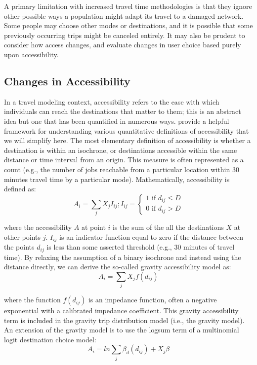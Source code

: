 A primary limitation with increased travel time methodologies is that they
ignore other possible ways a population might adapt its travel to a
damaged
network. Some people may choose other modes or destinations, and it is
possible
that some previously occurring trips might be canceled entirely. It may also be
prudent to consider how access changes, and evaluate changes in user choice
based purely upon accessibility.

\subsection{Changes in Accessibility}
\label{sec:cacc}
In a travel modeling context, {accessibility} refers to the ease
with which
individuals can reach the destinations that matter to them; this is an
abstract
idea but one that has been quantified in numerous ways. \citet{dong2006}
provide a
helpful framework for understanding various quantitative definitions of
accessibility that we will simplify here. The most elementary definition of
accessibility is whether a destination is within an isochrone, or
destinations accessible within the same distance or time interval from an origin.
This measure is often represented as a count (e.g., the number
of jobs
reachable from a particular location within 30 minutes travel time by a
particular mode). Mathematically, accessibility is defined as:
\begin{equation}
A_i = \sum_{j} X_j I_{ij}; I_{ij} = \begin{cases}  1 \text{ if } d_{ij}
\leq D\\
0 \text{ if } d_{ij} > D \end{cases}
	\label{eqn:isochrone}
\end{equation}

\noindent where the accessibility \(A\) at point \(i\) is the sum of the all the
destinations \(X\) at other points \(j\). \(I_{ij}\) is an indicator
function equal to
zero if the distance between the points $d_{ij}$ is less than some asserted
threshold (e.g., 30 minutes of travel time). By relaxing the
assumption of a
binary isochrone and instead using the distance directly, we can derive the
so-called gravity accessibility model as:
\begin{equation}
A_i = \sum_{j} X_j f(d_{ij})
  \label{eqn::gravity}
\end{equation}

\noindent where the function $f(d_{ij})$ is an impedance function, often a
negative exponential with a calibrated
impedance coefficient. This gravity accessibility term is included in the
gravity trip distribution model (i.e., the gravity model). An extension of the gravity model is to use the
logsum
term of a multinomial logit destination choice model:
\begin{equation}
A_i = ln\sum_{j} \beta_d(d_{ij}) + X_j\beta
  \label{eqn:logsum1}
\end{equation}

